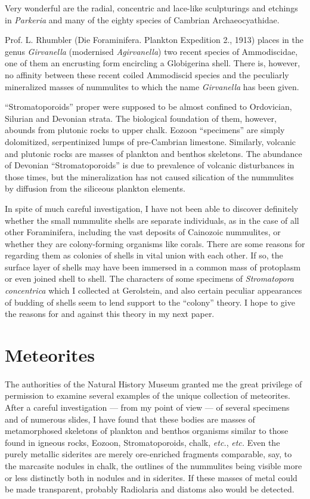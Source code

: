 \documentclass[a4paper, 12pt, oneside]{article}
\begin{document}
Very wonderful are the radial, concentric and lace-like sculpturings and etchings in \emph{Parkeria} and many of the eighty species of Cambrian Archaeocyathidae.

Prof. L. Rhumbler (Die Foraminifera. Plankton Expedition 2., 1913) places in the genus \emph{Girvanella} (modernised \emph{Agirvanella}) two recent species of Ammodiscidae, one of them an encrusting form encircling a Globigerina shell. There is, however, no affinity between these recent coiled Ammodiscid species and the peculiarly mineralized masses of nummulites to which the name \emph{Girvanella} has been given.

``Stromatoporoids'' proper were supposed to be almost confined to Ordovician, Silurian and Devonian strata. The biological foundation of them, however, abounds from plutonic rocks to upper chalk. Eozoon ``specimens'' are simply dolomitized, serpentinized lumps of pre-Cambrian limestone. Similarly, volcanic and plutonic rocks are masses of plankton and benthos skeletons. The abundance of Devonian ``Stromatoporoids'' is due to prevalence of volcanic disturbances in those times, but the mineralization has not caused silication of the nummulites by diffusion from the siliceous plankton elements.

In spite of much careful investigation, I have not been able to discover definitely whether the small nummulite shells are separate individuals, as in the case of all other Foraminifera, including the vast deposits of Cainozoic nummulites, or whether they are colony-forming organisms like corals. There are some reasons for regarding them as colonies of shells in vital union with each other. If so, the surface layer of shells may have been immersed in a common mass of protoplasm or even joined shell to shell. The characters of some specimens of \emph{Stromatopora concentrica} which I collected at Gerolstein, and also certain peculiar appearances of budding of shells seem to lend support to the ``colony'' theory. I hope to give the reasons for and against this theory in my next paper.
\clearpage
\section{Meteorites}
\paragraph{}
The authorities of the Natural History Museum granted me the great privilege of permission to examine several examples of the unique collection of meteorites. After a careful investigation --- from my point of view --- of several specimens and of numerous slides, I have found that these bodies are masses of metamorphosed skeletons of plankton and benthos organisms similar to those found in igneous rocks, Eozoon, Stromatoporoids, chalk, \emph{etc.}, \emph{etc.} Even the purely metallic siderites are merely ore-enriched fragments comparable, say, to the marcasite nodules in chalk, the outlines of the nummulites being visible more or less distinctly both in nodules and in siderites. If these masses of metal could be made transparent, probably Radiolaria and diatoms also would be detected.
\end{document}
